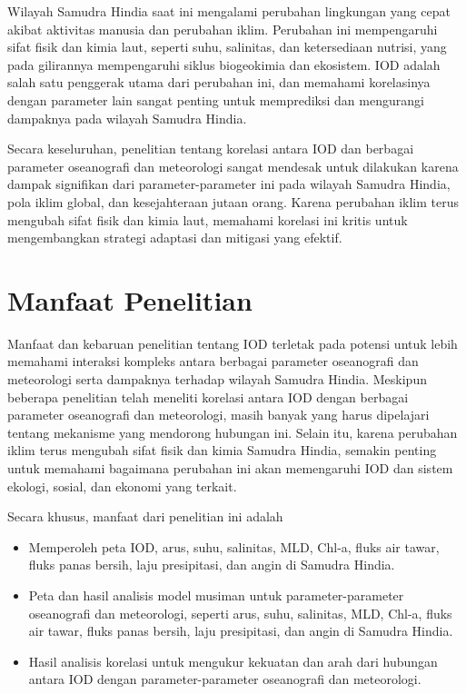 \begin{spacing}{1.5}
	Wilayah Samudra Hindia saat ini mengalami perubahan lingkungan yang cepat akibat aktivitas manusia dan perubahan iklim. Perubahan ini mempengaruhi sifat fisik dan kimia laut, seperti suhu, salinitas, dan ketersediaan nutrisi, yang pada gilirannya mempengaruhi siklus biogeokimia dan ekosistem. IOD adalah salah satu penggerak utama dari perubahan ini, dan memahami korelasinya dengan parameter lain sangat penting untuk memprediksi dan mengurangi dampaknya pada wilayah Samudra Hindia.
	
	Secara keseluruhan, penelitian tentang korelasi antara IOD dan berbagai parameter oseanografi dan meteorologi sangat mendesak untuk dilakukan karena dampak signifikan dari parameter-parameter ini pada wilayah Samudra Hindia, pola iklim global, dan kesejahteraan jutaan orang. Karena perubahan iklim terus mengubah sifat fisik dan kimia laut, memahami korelasi ini kritis untuk mengembangkan strategi adaptasi dan mitigasi yang efektif.
	\section[Manfaat Penelitian]{Manfaat Penelitian}
	
	Manfaat dan kebaruan penelitian tentang IOD terletak pada potensi untuk lebih memahami interaksi kompleks antara berbagai parameter oseanografi dan meteorologi serta dampaknya terhadap wilayah Samudra Hindia. Meskipun beberapa penelitian telah meneliti korelasi antara IOD dengan berbagai parameter oseanografi dan meteorologi, masih banyak yang harus dipelajari tentang mekanisme yang mendorong hubungan ini.
	Selain itu, karena perubahan iklim terus mengubah sifat fisik dan kimia Samudra Hindia, semakin penting untuk memahami bagaimana perubahan ini akan memengaruhi IOD dan sistem ekologi, sosial, dan ekonomi yang terkait. 
	
	Secara khusus, manfaat dari penelitian ini adalah
	\begin{itemize}
		\item Memperoleh peta IOD, arus, suhu, salinitas, MLD, Chl-a, fluks air tawar, fluks panas bersih, laju presipitasi, dan angin di Samudra Hindia.
		\item Peta dan hasil analisis model musiman untuk parameter-parameter oseanografi dan meteorologi, seperti arus, suhu, salinitas, MLD, Chl-a, fluks air tawar, fluks panas bersih, laju presipitasi, dan angin di Samudra Hindia.
		\item Hasil analisis korelasi untuk mengukur kekuatan dan arah dari hubungan antara IOD dengan parameter-parameter oseanografi dan meteorologi.
	\end{itemize}
	

\end{spacing}
